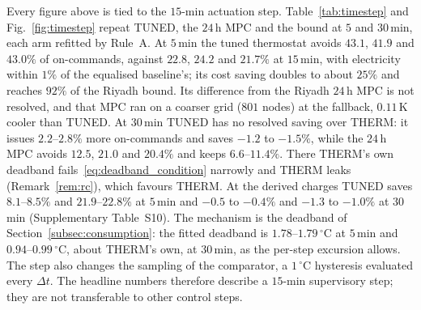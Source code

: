\documentclass[3p,twocolumn,number]{elsarticle}
\begin{document}
Every figure above is tied to the $15$-min actuation step. Table~\ref{tab:timestep} and Fig.~\ref{fig:timestep} repeat TUNED, the $24\,$h MPC and the bound at $5$ and $30\,$min, each arm refitted by Rule~A. At $5\,$min the tuned thermostat avoids $43.1$, $41.9$ and $43.0\%$ of on-commands, against $22.8$, $24.2$ and $21.7\%$ at $15\,$min, with electricity within $1\%$ of the equalised baseline's; its cost saving doubles to about $25\%$ and reaches $92\%$ of the Riyadh bound. Its difference from the Riyadh $24\,$h MPC is not resolved, and that MPC ran on a coarser grid ($801$ nodes) at the fallback, $0.11\,$K cooler than TUNED. At $30\,$min TUNED has no resolved saving over THERM: it issues $2.2$--$2.8\%$ more on-commands and saves $-1.2$ to $-1.5\%$, while the $24\,$h MPC avoids $12.5$, $21.0$ and $20.4\%$ and keeps $6.6$--$11.4\%$. There THERM's own deadband fails~\eqref{eq:deadband_condition} narrowly and THERM leaks (Remark~\ref{rem:rc}), which favours THERM. At the derived charges TUNED saves $8.1$--$8.5\%$ and $21.9$--$22.8\%$ at $5\,$min and $-0.5$ to $-0.4\%$ and $-1.3$ to $-1.0\%$ at $30\,$min (Supplementary Table~S10). The mechanism is the deadband of Section~\ref{subsec:consumption}: the fitted deadband is $1.78$--$1.79\,^\circ$C at $5\,$min and $0.94$--$0.99\,^\circ$C, about THERM's own, at $30\,$min, as the per-step excursion allows. The step also changes the sampling of the comparator, a $1\,^\circ$C hysteresis evaluated every $\Delta t$. The headline numbers therefore describe a $15$-min supervisory step; they are not transferable to other control steps.


\end{document}
